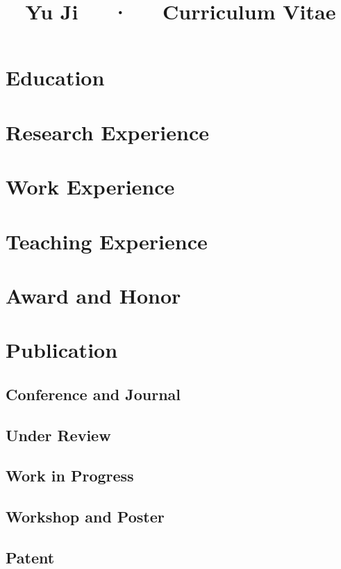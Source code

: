 \documentclass[sans]{modularcv}
\title{Yu Ji~~~·~~~Curriculum Vitae}
\begin{document}
\makecvheader
\makefooter

\section{Education}
\makeEducation

\section{Research Experience}
\makeResearchExperience

\section{Work Experience}
\makeWorkExperience

\section{Teaching Experience}
\makeTeaching

\section{Award and Honor}
\makeAward

\section{Publication}
\subsection{Conference and Journal}

\subsection{Under Review}

\subsection{Work in Progress}

\subsection{Workshop and Poster}

\subsection{Patent}
\end{document}

